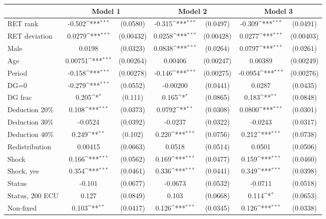{
\def\sym#1{\ifmmode^{#1}\else\(^{#1}\)\fi}
\begin{tabular}{l*{3}{cc}}
\hline\hline
                &\multicolumn{2}{c}{Model 1} &\multicolumn{2}{c}{Model 2} &\multicolumn{2}{c}{Model 3} \\
\hline
RET rank        &   -0.502\sym{***}& (0.0580)&   -0.315\sym{***}& (0.0497)&   -0.309\sym{***}& (0.0491)\\
RET deviation   &   0.0279\sym{***}&(0.00432)&   0.0258\sym{***}&(0.00428)&   0.0277\sym{***}&(0.00403)\\
Male            &   0.0198         & (0.0323)&   0.0838\sym{***}& (0.0264)&   0.0797\sym{***}& (0.0261)\\
Age             &  0.00751\sym{***}&(0.00264)&  0.00406         &(0.00247)&  0.00389         &(0.00249)\\
Period          &   -0.158\sym{***}&(0.00278)&   -0.146\sym{***}&(0.00275)&  -0.0954\sym{***}&(0.00276)\\
DG=0            &   -0.279\sym{***}& (0.0552)& -0.00200         & (0.0441)&   0.0287         & (0.0435)\\
DG frac         &    0.205\sym{*}  &  (0.111)&    0.165\sym{*}  & (0.0865)&    0.183\sym{**} & (0.0848)\\
Deduction 20\%  &    0.108\sym{***}& (0.0373)&   0.0792\sym{**} & (0.0308)&   0.0800\sym{***}& (0.0301)\\
Deduction 30\%  &  -0.0524         & (0.0392)&  -0.0237         & (0.0322)&  -0.0243         & (0.0317)\\
Deduction 40\%  &    0.249\sym{**} &  (0.102)&    0.220\sym{***}& (0.0756)&    0.212\sym{***}& (0.0738)\\
Redistribution  &  0.00415         & (0.0663)&   0.0518         & (0.0514)&   0.0501         & (0.0506)\\
Shock           &    0.166\sym{***}& (0.0562)&    0.169\sym{***}& (0.0477)&    0.159\sym{***}& (0.0460)\\
Shock, yes      &    0.354\sym{***}& (0.0461)&    0.336\sym{***}& (0.0441)&    0.349\sym{***}& (0.0398)\\
Status          &   -0.101         & (0.0677)&  -0.0673         & (0.0532)&  -0.0711         & (0.0518)\\
Status, 200 ECU &    0.127         & (0.0849)&    0.103         & (0.0668)&    0.114\sym{*}  & (0.0653)\\
Non-fixed       &    0.103\sym{**} & (0.0417)&    0.126\sym{***}& (0.0345)&    0.126\sym{***}& (0.0338)\\

\end{tabular}}
